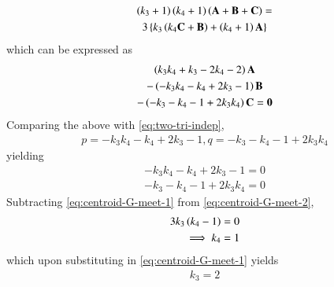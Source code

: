 \begin{enumerate}[label=\thesection.\arabic*.,ref=\thesection.\theenumi]
\begin{multline}
\left(k_3+1\right)\left(k_4+1\right)\left({\mathbf{A}+\mathbf{B} + \mathbf{C}}\right)
 = 
 \\
	  {3} \left\{ {k_3\left({k_4\mathbf{C}+\mathbf{B} }\right) +\left(k_4+1\right)\mathbf{A} }\right\} 
  \end{multline}
  which can be expressed as
  \begin{multline}
	  \left(k_3k_4+k_3-2k_4-2\right)\mathbf{A}
	  \\
	-  \left(-k_3k_4-k_4+2k_3-1\right)\mathbf{B}
	  \\
	  - \left(-k_3-k_4 - 1 
+2k_3k_4\right) \mathbf{C} = \mathbf{0}
  \end{multline}
  Comparing the above with 
	  \eqref{eq:two-tri-indep},
  \begin{align}
	  p = {-k_3k_4-k_4+2k_3-1}, q = {-k_3-k_4 - 1 
+2k_3k_4}
  \end{align}
  yielding 
  \begin{align}
	  \label{eq:centroid-G-meet-1}
	   {-k_3k_4-k_4+2k_3-1} = 0
	   \\ {-k_3-k_4 - 1 
+2k_3k_4} = 0
	  \label{eq:centroid-G-meet-2}
  \end{align}
  Subtracting 
	  \eqref{eq:centroid-G-meet-1}
	  from
	  \eqref{eq:centroid-G-meet-2},
  \begin{align}
	  3k_3\left(k_4-1\right) &= 0
	  \\
	  \implies k_4&=1
  \end{align}
  which upon substituting in 
	  \eqref{eq:centroid-G-meet-1}
	  yields
  \begin{align}
	  k_3 = 2
  \end{align}
\end{enumerate}
